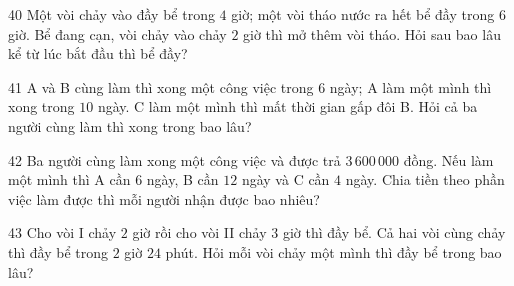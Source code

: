 \gap
\begin{probbox}{40}{}
Một vòi chảy vào đầy bể trong $4$ giờ; một vòi tháo nước ra hết bể đầy trong $6$ giờ. Bể đang cạn, vòi chảy vào chảy $2$ giờ thì mở thêm vòi tháo. Hỏi sau bao lâu kể từ lúc bắt đầu thì bể đầy?
\end{probbox}
\gap
\begin{probbox}{41}{}
A và B cùng làm thì xong một công việc trong $6$ ngày; A làm một mình thì xong trong $10$ ngày. C làm một mình thì mất thời gian gấp đôi B. Hỏi cả ba người cùng làm thì xong trong bao lâu?
\end{probbox}
\gap
\begin{probbox}{42}{}
Ba người cùng làm xong một công việc và được trả $3\,600\,000$ đồng. Nếu làm một mình thì A cần $6$ ngày, B cần $12$ ngày và C cần $4$ ngày. Chia tiền theo phần việc làm được thì mỗi người nhận được bao nhiêu?
\end{probbox}
\gap
\begin{probbox}{43}{}
Cho vòi I chảy $2$ giờ rồi cho vòi II chảy $3$ giờ thì đầy bể. Cả hai vòi cùng chảy thì đầy bể trong $2$ giờ $24$ phút. Hỏi mỗi vòi chảy một mình thì đầy bể trong bao lâu?
\end{probbox}
